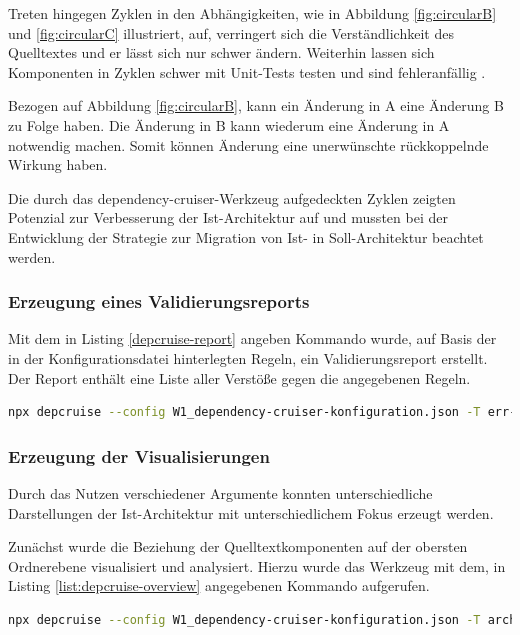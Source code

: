 Treten hingegen Zyklen in den Abhängigkeiten, wie in Abbildung \ref{fig:circularB} und \ref{fig:circularC} illustriert, auf, verringert sich die Verständlichkeit des Quelltextes und er lässt sich nur schwer ändern. Weiterhin lassen sich Komponenten in Zyklen schwer mit Unit-Tests testen und sind fehleranfällig \autocite[vgl.][116-117]{Martin2018}.

Bezogen auf Abbildung \ref{fig:circularB}, kann ein Änderung in A eine Änderung B zu Folge haben. Die Änderung in B kann wiederum eine Änderung in A notwendig machen. Somit können Änderung eine unerwünschte rückkoppelnde Wirkung haben.

Die durch das dependency-cruiser-Werkzeug aufgedeckten Zyklen zeigten Potenzial zur Verbesserung der Ist-Architektur auf und mussten bei der Entwicklung der Strategie zur Migration von Ist- in Soll-Architektur beachtet werden.

\subsubsection{Erzeugung eines Validierungsreports}
Mit dem in Listing \ref{depcruise-report} angeben Kommando wurde, auf Basis der in der Konfigurationsdatei hinterlegten Regeln, ein Validierungsreport erstellt.
Der Report enthält eine Liste aller Verstöße gegen die angegebenen Regeln.
\begin{lstlisting}[language={sh}, label=depcruise-report, caption=Kommando zur Erzeugung eines Validierungsreports]
npx depcruise --config W1_dependency-cruiser-konfiguration.json -T err-html src -f Validierungsreport.html
\end{lstlisting}

\subsubsection{Erzeugung der Visualisierungen}
Durch das Nutzen verschiedener Argumente konnten unterschiedliche Darstellungen der Ist-Architektur mit unterschiedlichem Fokus erzeugt werden. 

Zunächst wurde die Beziehung der Quelltextkomponenten auf der obersten Ordnerebene visualisiert und analysiert. 
Hierzu wurde das Werkzeug mit dem, in Listing \ref{list:depcruise-overview} angegebenen Kommando aufgerufen.

\begin{lstlisting}[language={sh}, label=list:depcruise-overview, caption=Kommando zur Erzeugung der Visualisierung der obersten Ordnerebene]
npx depcruise --config W1_dependency-cruiser-konfiguration.json -T archi src | dot -T svg > Projektuebersicht.svg
\end{lstlisting}

